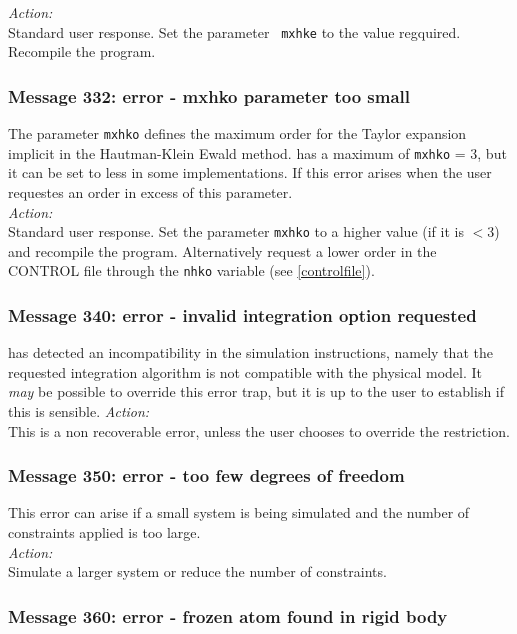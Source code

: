\noindent
{\em Action:} \\ Standard user response. Set the parameter {\tt
mxhke} to the value regquired. Recompile the program.

\subsubsection*{Message 332: error - mxhko parameter too small}

The parameter {\tt mxhko} defines the maximum order for the Taylor
expansion implicit in the Hautman-Klein Ewald method. \D{} has a maximum
of {\tt mxhko} = 3, but it can be set to less in some
implementations. If this error arises when the user requestes an
order in excess of this parameter.\\

\noindent
{\em Action:} \\ Standard user response. Set the parameter {\tt mxhko}
to a higher value (if it is $<$3) and recompile the
program. Alternatively request a lower order in the CONTROL file
through the {\tt nhko} variable (see \ref{controlfile}).

\subsubsection*{Message 340: error - invalid integration option requested}

\D{} has detected an incompatibility in the simulation instructions,
namely that the requested integration algorithm is not compatible with
the physical model. It {\em may} be possible to override this error trap,
but it is up to the user to establish if this is sensible.
\noindent
{\em Action:} \\ 
This is a non recoverable error, unless the user chooses to override
the restriction.

\subsubsection*{Message 350: error - too few degrees of freedom}

This error can arise if a small system is being simulated and the
number of constraints applied is too large.\\

\noindent
{\em Action:} \\ 
Simulate a larger system or reduce the number of constraints.

\subsubsection*{Message 360: error - frozen atom found in rigid
body}

